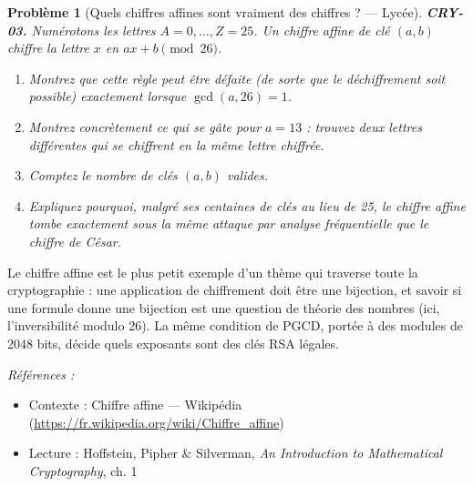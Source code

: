 \documentclass[11pt]{article}
\newtheorem{problem}{Problème}
\newenvironment{refs}{\par\small\noindent\emph{Références :}\begin{itemize}\setlength\itemsep{0pt}}{\end{itemize}\normalsize}
\begin{document}
\bigskip

\begin{problem}[{Quels chiffres affines sont vraiment des chiffres ? --- Lycée}]
\textbf{CRY-03.} Numérotons les lettres $A=0,\dots,Z=25$. Un
\textit{chiffre affine} de clé $(a,b)$ chiffre la lettre $x$ en
$ax+b \pmod{26}$.
\begin{enumerate}
\item[(a)] Montrez que cette règle peut être défaite (de sorte que le déchiffrement soit
possible) exactement lorsque $\gcd(a,26)=1$.
\item[(b)] Montrez concrètement ce qui se gâte pour
$a=13$ : trouvez deux lettres différentes qui se chiffrent en la même lettre chiffrée.
\item[(c)] Comptez le nombre de clés $(a,b)$ valides.
\item[(d)] Expliquez pourquoi, malgré ses centaines
de clés au lieu de 25, le chiffre affine tombe exactement sous la même attaque par analyse
fréquentielle que le chiffre de César.
\end{enumerate}

\end{problem}

\noindent Le chiffre affine est le plus petit exemple d'un thème qui traverse toute
la cryptographie : une application de chiffrement doit être une bijection, et savoir si une
formule donne une bijection est une question de théorie des nombres (ici, l'inversibilité
modulo 26). La même condition de PGCD, portée à des modules de 2048 bits, décide quels
exposants sont des clés RSA légales.

\begin{refs}
\item Contexte : Chiffre affine --- Wikipédia (\url{https://fr.wikipedia.org/wiki/Chiffre_affine})
\item Lecture : Hoffstein, Pipher \& Silverman, \textit{An Introduction to Mathematical Cryptography}, ch. 1
\end{refs}

\bigskip
\end{document}
